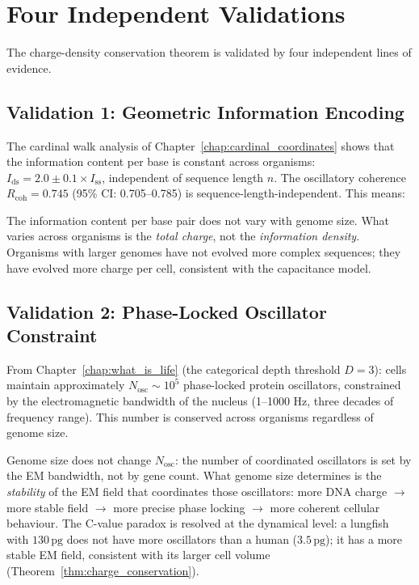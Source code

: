 \section{Four Independent Validations}
\label{sec:validations}

The charge-density conservation theorem is validated by four independent
lines of evidence.

\subsection{Validation 1: Geometric Information Encoding}
\label{ssec:val_information}

The cardinal walk analysis of Chapter~\ref{chap:cardinal_coordinates}
shows that the information content per base is constant across organisms:
$I_{\mathrm{ds}} = 2.0 \pm 0.1 \times I_{\mathrm{ss}}$, independent
of sequence length $n$. The oscillatory coherence $R_{\mathrm{coh}} = 0.745$
(95\% CI: 0.705--0.785) is sequence-length-independent. This means:

\begin{keyresult}
The information content per base pair does not vary with genome size.
What varies across organisms is the \emph{total charge}, not the
\emph{information density}. Organisms with larger genomes have not
evolved more complex sequences; they have evolved more charge per cell,
consistent with the capacitance model.
\end{keyresult}

\subsection{Validation 2: Phase-Locked Oscillator Constraint}
\label{ssec:val_oscillators}

From Chapter~\ref{chap:what_is_life} (the categorical depth threshold
$D = 3$): cells maintain approximately $N_{\mathrm{osc}} \sim 10^5$
phase-locked protein oscillators, constrained by the electromagnetic
bandwidth of the nucleus (1--1000 Hz, three decades of frequency
range). This number is conserved across organisms regardless of genome
size.

Genome size does not change $N_{\mathrm{osc}}$: the number of
coordinated oscillators is set by the EM bandwidth, not by gene count.
What genome size determines is the \emph{stability} of the EM field
that coordinates those oscillators: more DNA charge $\to$ more stable
field $\to$ more precise phase locking $\to$ more coherent cellular
behaviour. The C-value paradox is resolved at the dynamical level: a
lungfish with $130\,\mathrm{pg}$ does not have more oscillators than
a human ($3.5\,\mathrm{pg}$); it has a more stable EM field, consistent
with its larger cell volume (Theorem~\ref{thm:charge_conservation}).

